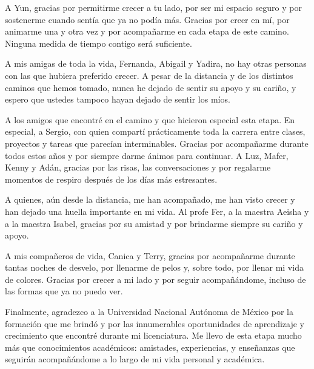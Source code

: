 \begin{acknowledgements}
A Yun, gracias por permitirme crecer a tu lado, por ser mi espacio seguro y por sostenerme cuando sentía que ya no podía más. Gracias por creer en mí, por animarme una y otra vez y por acompañarme en cada etapa de este camino. Ninguna medida de tiempo contigo será suficiente.

A mis amigas de toda la vida, Fernanda, Abigail y Yadira, no hay otras personas con las que hubiera preferido crecer. A pesar de la distancia y de los distintos caminos que hemos tomado, nunca he dejado de sentir su apoyo y su cariño, y espero que ustedes tampoco hayan dejado de sentir los míos.

A los amigos que encontré en el camino y que hicieron especial esta etapa. En especial, a Sergio, con quien compartí prácticamente toda la carrera entre clases, proyectos y tareas que parecían interminables. Gracias por acompañarme durante todos estos años y por siempre darme ánimos para continuar. A Luz, Mafer, Kenny y Adán, gracias por las risas, las conversaciones y por regalarme momentos de respiro después de los días más estresantes.

A quienes, aún desde la distancia, me han acompañado, me han visto crecer y han dejado una huella importante en mi vida. Al profe Fer, a la maestra Aeisha y a la maestra Isabel, gracias por su amistad y por brindarme siempre su cariño y apoyo.

A mis compañeros de vida, Canica y Terry, gracias por acompañarme durante tantas noches de desvelo, por llenarme de pelos y, sobre todo, por llenar mi vida de colores. Gracias por crecer a mi lado y por seguir acompañándome, incluso de las formas que ya no puedo ver.

Finalmente, agradezco a la Universidad Nacional Autónoma de México por la formación que me brindó y por las innumerables oportunidades de aprendizaje y crecimiento que encontré durante mi licenciatura. Me llevo de esta etapa mucho más que conocimientos académicos: amistades, experiencias, y enseñanzas que seguirán acompañándome a lo largo de mi vida personal y académica.




\end{acknowledgements}
